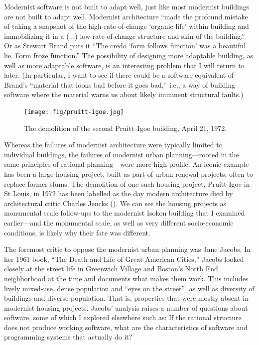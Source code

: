 Modernist software is not built to adapt well, just like most modernist buildings are not
built to adapt well. Modernist architecture ``made the profound mistake of taking a
snapshot of the high-rate-of-change `organic life' within building and immobilizing it
in a (...) low-rate-of-change structure and skin of the building.''
Or as Stewart Brand puts it ``The credo `form follows function' was a beautiful lie.
Form froze function.'' The possibility of designing more adaptable building,
as well as more adaptable software, is an interesting problem that I will return to later.
(In particular, I want to see if there could be a software equivalent of Brand's ``material
that looks bad before it goes bad,'' i.e., a way of building software where the material
warns us about likely imminent structural faults.)

\begin{figure}
  \centering
  \texttt{[image: fig/pruitt-igoe.jpg]}
  \caption{The demolition of the second Pruitt–Igoe building, April 21, 1972.}
  \label{fig:pruitt}
\end{figure}

Whereas the failures of modernist architecture were typically limited to individual buildings,
the failures of modernist urban planning---rooted in the same principles of rational
planning---were more high-profile. An iconic example has been a large housing project,
built as part of urban renewal projects, often to replace former slums. The demolition
of one such housing project, Pruitt-Igoe in St Louis, in 1972 has been labelled as the
day modern architecture died by architectural critic Charles Jencks ().
We can see the housing projects as monumental scale follow-ups to the modernist Isokon building
that I examined earlier---and the monumental scale, as well as very different socio-economic
conditions, is likely why their fate was different.

The foremost critic to oppose the modernist urban planning was Jane Jacobs. In her 1961 book,
``The Death and Life of Great American Cities,'' Jacobs looked closely at
the street life in Greenwich Village and Boston's North End neighborhood at the time and
documents what makes them work. This includes lively mixed-use, dense population and
``eyes on the street'', as well as diversity of buildings and diverse population. That is,
properties that were mostly absent in modernist housing projects. Jacobs' analysis
raises a number of questions about software, some of which I explored
elsewhere such as:
If the rational structure does not produce working software, what are the characteristics
of software and programming systems that actually do it?

